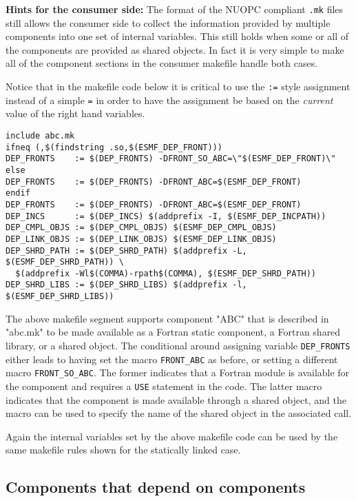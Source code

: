{\bf Hints for the consumer side:} The format of the NUOPC compliant {\tt .mk} files still allows the consumer side to collect the information provided by multiple components into one set of internal variables. This still holds when some or all of the components are provided as shared objects. In fact it is very simple to make all of the component sections in the consumer makefile handle both cases.

Notice that in the makefile code below it is critical to use the {\tt :=} style assignment instead of a simple {\tt =} in order to have the assignment be based on the {\em current} value of the right hand variables.

\begin{verbatim}
include abc.mk
ifneq (,$(findstring .so,$(ESMF_DEP_FRONT)))
DEP_FRONTS    := $(DEP_FRONTS) -DFRONT_SO_ABC=\"$(ESMF_DEP_FRONT)\"
else
DEP_FRONTS    := $(DEP_FRONTS) -DFRONT_ABC=$(ESMF_DEP_FRONT)
endif
DEP_FRONTS    := $(DEP_FRONTS) -DFRONT_ABC=$(ESMF_DEP_FRONT)
DEP_INCS      := $(DEP_INCS) $(addprefix -I, $(ESMF_DEP_INCPATH))
DEP_CMPL_OBJS := $(DEP_CMPL_OBJS) $(ESMF_DEP_CMPL_OBJS)
DEP_LINK_OBJS := $(DEP_LINK_OBJS) $(ESMF_DEP_LINK_OBJS)
DEP_SHRD_PATH := $(DEP_SHRD_PATH) $(addprefix -L, $(ESMF_DEP_SHRD_PATH)) \
  $(addprefix -Wl$(COMMA)-rpath$(COMMA), $(ESMF_DEP_SHRD_PATH))
DEP_SHRD_LIBS := $(DEP_SHRD_LIBS) $(addprefix -l, $(ESMF_DEP_SHRD_LIBS))
\end{verbatim}

The above makefile segment supports component "ABC" that is described in "abc.mk" to be made available as a Fortran static component, a Fortran shared library, or a shared object. The conditional around assigning variable {\tt DEP\_FRONTS} either leads to having set the macro {\tt FRONT\_ABC} as before, or setting a different macro {\tt FRONT\_SO\_ABC}. The former indicates that a Fortran module is available for the component and requires a {\tt USE} statement in the code. The latter macro indicates that the component is made available through a shared object, and the macro can be used to specify the name of the shared object in the associated call.

Again the internal variables set by the above makefile code can be used by the same makefile rules shown for the statically linked case.

\subsection{Components that depend on components}
\label{StandardCompDep:CompOnComp}

